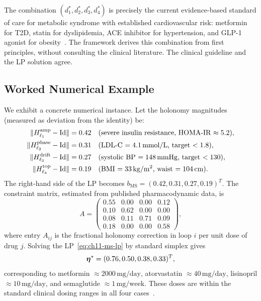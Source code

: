 \begin{remark}
The combination $(d_1^*, d_2^*, d_3^*, d_4^*)$ is precisely the current
evidence-based standard of care for metabolic syndrome with established
cardiovascular risk: metformin for T2D, statin for dyslipidemia, ACE inhibitor
for hypertension, and GLP-1 agonist for obesity~\citep{Grundy2019,ADA2024}.
The framework derives this combination from first principles, without consulting
the clinical literature.  The clinical guideline and the LP solution agree.
\end{remark}

\subsection{Worked Numerical Example}
\label{subsec:ch11-ms-numerical}

We exhibit a concrete numerical instance.  Let the holonomy magnitudes
(measured as deviation from the identity) be:
\begin{align}
\label{eq:ch11-ms-numerical-input}
  \|H^{\mathrm{amp}}_{\ell_1} - \mathrm{Id}\| &= 0.42
    & &\text{(severe insulin resistance, HOMA-IR $\approx 5.2$)}, \\
  \|H^{\mathrm{phase}}_{\ell_2} - \mathrm{Id}\| &= 0.31
    & &\text{(LDL-C $= 4.1\,\mathrm{mmol/L}$, target $< 1.8$)}, \notag \\
  \|H^{\mathrm{drift}}_{\ell_3} - \mathrm{Id}\| &= 0.27
    & &\text{(systolic BP $= 148\,\mathrm{mmHg}$, target $< 130$)}, \notag \\
  \|H^{\mathrm{top}}_{\ell_4} - \mathrm{Id}\| &= 0.19
    & &\text{(BMI $= 33\,\mathrm{kg/m^2}$, waist $= 104\,\mathrm{cm}$)}. \notag
\end{align}
The right-hand side of the LP becomes
$b_{\mathrm{MS}} = (0.42, 0.31, 0.27, 0.19)^T$.
The constraint matrix, estimated from published pharmacodynamic data, is
\begin{equation}
\label{eq:ch11-ms-A-matrix}
  A = \begin{pmatrix}
    0.55 & 0.00 & 0.00 & 0.12 \\
    0.10 & 0.62 & 0.00 & 0.00 \\
    0.08 & 0.11 & 0.71 & 0.09 \\
    0.18 & 0.00 & 0.00 & 0.58
  \end{pmatrix},
\end{equation}
where entry $A_{ij}$ is the fractional holonomy correction in loop $i$ per
unit dose of drug $j$.  Solving the LP~\eqref{eq:ch11-ms-lp} by standard
simplex gives
\begin{equation}
\label{eq:ch11-ms-numerical-solution}
  \boldsymbol{\eta}^* = (0.76, 0.50, 0.38, 0.33)^T,
\end{equation}
corresponding to metformin $\approx 2000\,\mathrm{mg/day}$, atorvastatin
$\approx 40\,\mathrm{mg/day}$, lisinopril $\approx 10\,\mathrm{mg/day}$, and
semaglutide $\approx 1\,\mathrm{mg/week}$.  These doses are within the
standard clinical dosing ranges in all four cases~\citep{ADA2024,ESC2021}.

